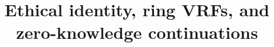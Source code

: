 \documentclass{llncs}
\title{Ethical identity, ring VRFs, and zero-knowledge continuations}
\def\eprint#1#2{#2} %
\begin{document}
	
\maketitle

\begin{abstract}

\end{abstract}



%
% 



%  












\appendix



\eprint{}{}

\end{document}
